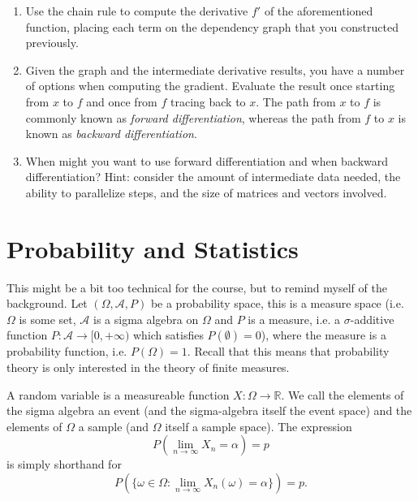 \documentclass{article}
\begin{document}
\begin{enumerate}
\item Use the chain rule to compute the derivative $f'$ of the aforementioned function, placing each term on the dependency graph that you constructed previously.
\item Given the graph and the intermediate derivative results, you have a number of options when computing the gradient. Evaluate the result once starting from $x$ to $f$ and once from $f$ tracing back to $x$. The path from $x$ to $f$ is commonly known as \textit{forward differentiation}, whereas the path from $f$ to $x$ is known as \textit{backward differentiation}.
\item When might you want to use forward differentiation and when backward differentiation? Hint: consider the amount of intermediate data needed, the ability to parallelize steps, and the size of matrices and vectors involved.
\end{enumerate}

\section{Probability and Statistics}
This might be a bit too technical for the course, but to remind myself of the background. Let $(\Omega, \mathcal{A}, P)$ be a probability space, this is a measure space (i.e. $\Omega$ is some set, $\mathcal{A}$ is a sigma algebra on $\Omega$ and $P$ is a measure, i.e. a $\sigma$-additive function $P : \mathcal{A} \rightarrow [0, +\infty)$ which satisfies $P(\emptyset) = 0$), where the measure is a probability function, i.e. $P(\Omega) = 1$. Recall that this means that probability theory is only interested in the theory of finite measures.

A random variable is a measureable function $X : \Omega \rightarrow \mathbb{R}$. We call the elements of the sigma algebra an event (and the sigma-algebra itself the event space) and the elements of $\Omega$ a sample (and $\Omega$ itself a sample space). The expression
$$
P\left(\lim_{n \rightarrow \infty} X_n = \alpha\right) = p
$$
is simply shorthand for
$$
P\left(\{\omega \in \Omega : \lim_{n \rightarrow \infty} X_n(\omega) = \alpha\}\right) = p.
$$
\end{document}
